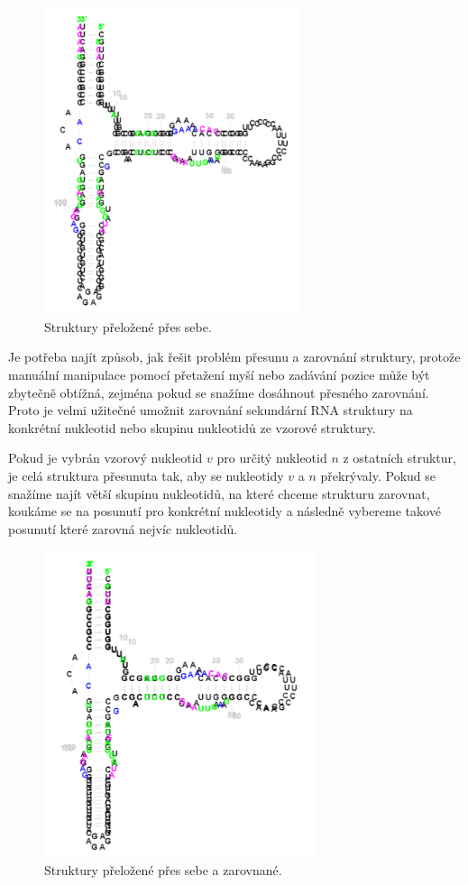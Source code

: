 \begin{figure}[H]
  \centering
  \includegraphics[height=90mm]{../img/kap02/align/unaligned.png}
  \caption{Struktury přeložené přes sebe.}
\end{figure}

Je potřeba najít způsob, jak řešit problém přesunu a zarovnání struktury,
protože manuální manipulace pomocí přetažení myší nebo zadávání pozice může být
zbytečně obtížná, zejména pokud se snažíme dosáhnout přesného zarovnání. Proto
je velmi užitečné umožnit zarovnání sekundární RNA struktury na konkrétní
nukleotid nebo skupinu nukleotidů ze vzorové struktury. 

Pokud je vybrán vzorový nukleotid $v$ pro určitý nukleotid $n$ z ostatních
struktur, je celá struktura přesunuta tak, aby se nukleotidy $v$ a $n$
překrývaly. Pokud se snažíme najít větší skupinu nukleotidů, na které chceme
strukturu zarovnat, koukáme se na posunutí pro konkrétní nukleotidy a následně
vybereme takové posunutí které zarovná nejvíc nukleotidů.

\begin{figure}[H]
  \centering
  \includegraphics[height=90mm]{../img/kap02/align/alignedAlpha1.png}
  \caption{Struktury přeložené přes sebe a zarovnané.}
\end{figure}

